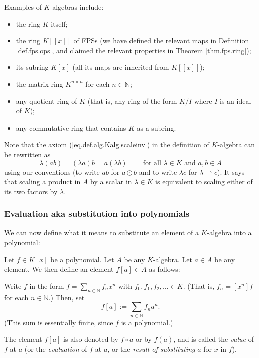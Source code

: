Examples of $K$-algebras include:

\begin{itemize}
\item the ring $K$ itself;

\item the ring $K\left[  \left[  x\right]  \right]  $ of FPSs (we have defined
the relevant maps in Definition \ref{def.fps.ops}, and claimed the relevant
properties in Theorem \ref{thm.fps.ring});

\item its subring $K\left[  x\right]  $ (all its maps are inherited from
$K\left[  \left[  x\right]  \right]  $);

\item the matrix ring $K^{n\times n}$ for each $n\in\mathbb{N}$;

\item any quotient ring of $K$ (that is, any ring of the form $K/I$ where $I$
is an ideal of $K$);

\item any commutative ring that contains $K$ as a subring.
\end{itemize}

Note that the axiom (\ref{eq.def.alg.Kalg.scaleinv}) in the definition of
$K$-algebra can be rewritten as%
\[
\lambda\left(  ab\right)  =\left(  \lambda a\right)  b=a\left(  \lambda
b\right)  \ \ \ \ \ \ \ \ \ \ \text{for all }\lambda\in K\text{ and }a,b\in A
\]
using our conventions (to write $ab$ for $a\odot b$ and to write $\lambda c$
for $\lambda\rightharpoonup c$). It says that scaling a product in $A$ by a
scalar in $\lambda\in K$ is equivalent to scaling either of its two factors by
$\lambda$.

\subsubsection{Evaluation aka substitution into polynomials}

We can now define what it means to substitute an element of a $K$-algebra into
a polynomial:

\begin{definition}
\label{def.pol.subs}Let $f\in K\left[  x\right]  $ be a polynomial. Let $A$ be
any $K$-algebra. Let $a\in A$ be any element. We then define an element
$f\left[  a\right]  \in A$ as follows:

Write $f$ in the form $f=\sum_{n\in\mathbb{N}}f_{n}x^{n}$ with $f_{0}%
,f_{1},f_{2},\ldots\in K$. (That is, $f_{n}=\left[  x^{n}\right]  f$ for each
$n\in\mathbb{N}$.) Then, set%
\[
f\left[  a\right]  :=\sum_{n\in\mathbb{N}}f_{n}a^{n}.
\]
(This sum is essentially finite, since $f$ is a polynomial.)

The element $f\left[  a\right]  $ is also denoted by $f\circ a$ or by
$f\left(  a\right)  $, and is called the \emph{value} of $f$ at $a$ (or the
\emph{evaluation} of $f$ at $a$, or the \emph{result of substituting }$a$ for
$x$ in $f$).
\end{definition}

